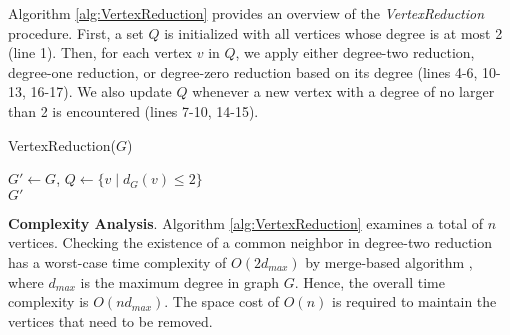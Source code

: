 \documentclass[sigconf, nonacm]{acmart}
\begin{document}
Algorithm \ref{alg:VertexReduction} provides an  overview of the \textit{VertexReduction} procedure. First, a set $Q$ is initialized with all vertices whose degree is at most 2 (line 1). Then, for each vertex $v$ in $Q$, we apply either degree-two reduction, degree-one reduction, or degree-zero reduction based on its degree (lines 4-6, 10-13, 16-17). We also update $Q$ whenever a new vertex with a degree of no larger than 2 is encountered (lines 7-10, 14-15).

\setlength{\textfloatsep}{8pt}%
\begin{algorithm}[t]
    \caption{VertexReduction($G$)}
    \label{alg:VertexReduction}
    \small
    \nl $G'\gets G$,  $Q \gets \{v\mid d_G(v)\leq 2\}$ \\

    \nl {}
    \nl \KwRet $G'$ \\
\end{algorithm}

\noindent\textbf{Complexity Analysis}. Algorithm \ref{alg:VertexReduction} examines a total of $n$ vertices. Checking the existence of a common neighbor in degree-two reduction has a worst-case time complexity of $O(2d_{max})$ by merge-based algorithm \cite{zheng2021accelerating},  where $d_{max}$ is the maximum degree in graph $G$. Hence, the overall time complexity is $O(nd_{max})$. %
The space cost of $O(n)$ is required to maintain the vertices that need to be removed. 
\end{document}
